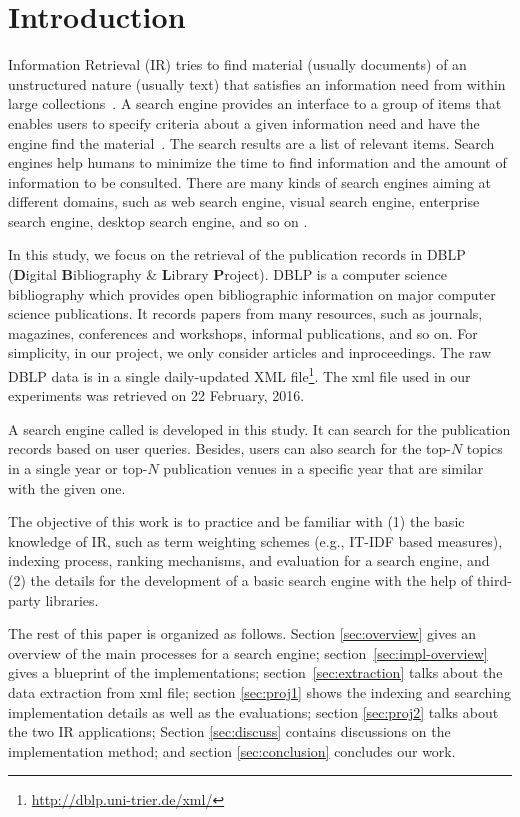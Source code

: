 \section{Introduction}

Information Retrieval (IR) tries to find material (usually documents) of an unstructured nature (usually text) that satisfies an information need from within large collections~\cite{MRS08}. A search engine provides an interface to a group of items that enables users to specify criteria about a given information need and have the engine find the material~\cite{search-engine}. The search results are a list of relevant items.
Search engines help humans to minimize the time to find information and the amount of information to be consulted.
There are many kinds of search engines aiming at different domains, such as web search engine, visual search engine, enterprise search engine, desktop search engine, and so on \cite{list-of-engine}.

In this study, we focus on the retrieval of the publication records in DBLP (\textbf{D}igital \textbf{B}ibliography \& \textbf{L}ibrary \textbf{P}roject).
DBLP is a computer science bibliography which provides open bibliographic information on major computer science publications. It records papers from many resources, such as journals, magazines, conferences and workshops, informal publications, and so on. For simplicity, in our project, we only consider articles and inproceedings. The raw DBLP data is in a single daily-updated XML file\footnote{\url{http://dblp.uni-trier.de/xml/}}. The xml file used in our experiments was retrieved on 22 February, 2016.

A search engine called {\SS} is developed in this study. It can search for the publication records based on user queries. Besides, users can also search for the top-$N$ topics in a single year or top-$N$ publication venues in a specific year that are similar with the given one.

The objective of this work is to practice and be familiar with (1) the basic knowledge of IR, such as term weighting schemes (e.g., IT-IDF based measures), indexing process, ranking mechanisms, and evaluation for a search engine, and (2) the details for the development of a basic search engine with the help of third-party libraries. 

The rest of this paper is organized as follows. Section \ref{sec:overview} gives an overview of the main processes for a search engine; section~\ref{sec:impl-overview} gives a blueprint of the implementations; section~\ref{sec:extraction} talks about the data extraction from xml file; section \ref{sec:proj1} shows the indexing and searching implementation details as well as the evaluations; section \ref{sec:proj2} talks about the two IR applications; Section \ref{sec:discuss} contains discussions on the implementation method; and section \ref{sec:conclusion} concludes our work.
